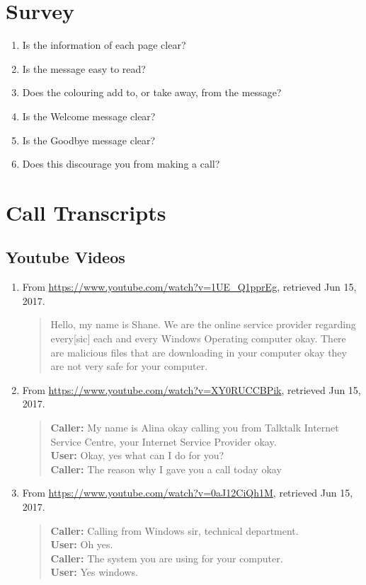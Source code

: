 \documentclass[main.tex]{subfiles}
\begin{document}
\section{Survey}\label{sec:appendix-survey}
\begin{enumerate}
	\item Is the information of each page clear?
	\item Is the message easy to read?
	\item Does the colouring add to, or take away, from the message?
	\item Is the Welcome message clear?
	\item Is the Goodbye message clear?
	\item Does this discourage you from making a call?
\end{enumerate}
\section{Call Transcripts}\label{sec:appendix-transcripts}
\subsection{Youtube Videos}
\begin{enumerate}
	\item From \url{https://www.youtube.com/watch?v=1UE_Q1pprEg}, retrieved Jun 15, 2017.
	\begin{quote}
		Hello, my name is Shane. We are the online service provider regarding every[sic] each and every Windows Operating computer okay. There are malicious files that are downloading in your computer okay they are not very safe for your computer.
	\end{quote}

	\item From \url{https://www.youtube.com/watch?v=XY0RUCCBPik}, retrieved Jun 15, 2017.
	\begin{quote}
		\textbf{Caller:} My name is Alina okay calling you from Talktalk Internet Service Centre, your Internet Service Provider okay.\\
		\textbf{User:} Okay, yes what can I do for you?\\
		\textbf{Caller:} The reason why I gave you a call today okay
	\end{quote}

	\item From \url{https://www.youtube.com/watch?v=0aJ12CiQh1M}, retrieved Jun 15, 2017.
	\begin{quote}
		\textbf{Caller:} Calling from Windows sir, technical department.\\
		\textbf{User:} Oh yes.\\
		\textbf{Caller:} The system you are using for your computer.\\
		\textbf{User:} Yes windows.
	\end{quote}
\end{enumerate}
\end{document}
